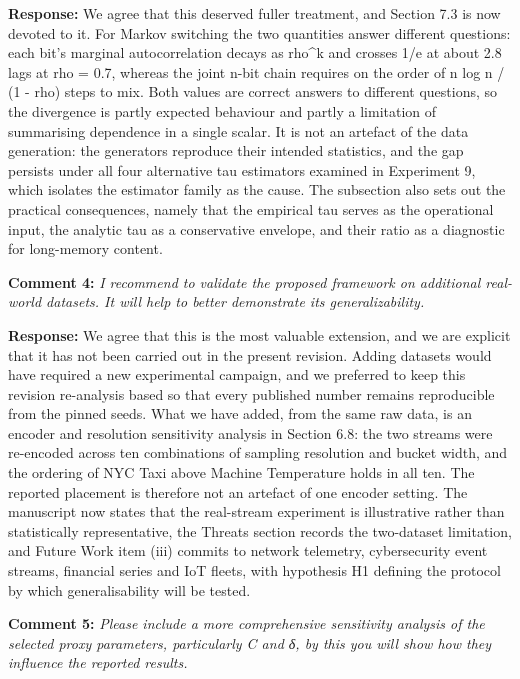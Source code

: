 \documentclass[
  11pt,
]{article}
\begin{document}
\textbf{Response:} We agree that this deserved fuller treatment, and
Section 7.3 is now devoted to it. For Markov switching the two
quantities answer different questions: each bit's marginal
autocorrelation decays as rho\^{}k and crosses 1/e at about 2.8 lags at
rho = 0.7, whereas the joint n-bit chain requires on the order of n log
n / (1 - rho) steps to mix. Both values are correct answers to different
questions, so the divergence is partly expected behaviour and partly a
limitation of summarising dependence in a single scalar. It is not an
artefact of the data generation: the generators reproduce their intended
statistics, and the gap persists under all four alternative tau
estimators examined in Experiment 9, which isolates the estimator family
as the cause. The subsection also sets out the practical consequences,
namely that the empirical tau serves as the operational input, the
analytic tau as a conservative envelope, and their ratio as a diagnostic
for long-memory content.

\textbf{Comment 4:} \emph{I recommend to validate the proposed framework
on additional real-world datasets. It will help to better demonstrate
its generalizability.}

\textbf{Response:} We agree that this is the most valuable extension,
and we are explicit that it has not been carried out in the present
revision. Adding datasets would have required a new experimental
campaign, and we preferred to keep this revision re-analysis based so
that every published number remains reproducible from the pinned seeds.
What we have added, from the same raw data, is an encoder and resolution
sensitivity analysis in Section 6.8: the two streams were re-encoded
across ten combinations of sampling resolution and bucket width, and the
ordering of NYC Taxi above Machine Temperature holds in all ten. The
reported placement is therefore not an artefact of one encoder setting.
The manuscript now states that the real-stream experiment is
illustrative rather than statistically representative, the Threats
section records the two-dataset limitation, and Future Work item (iii)
commits to network telemetry, cybersecurity event streams, financial
series and IoT fleets, with hypothesis H1 defining the protocol by which
generalisability will be tested.

\textbf{Comment 5:} \emph{Please include a more comprehensive
sensitivity analysis of the selected proxy parameters, particularly C
and δ, by this you will show how they influence the reported results.}
\end{document}
